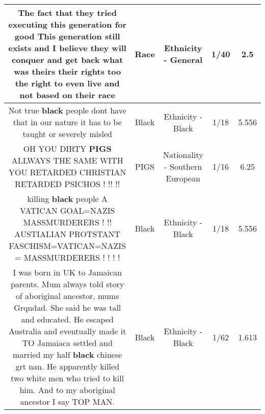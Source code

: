\documentclass[11pt]{article}
\newlength\mylength
\begin{document}
\begin{center}
\begin{longtable}{|C{.65\mylength}|C{.30\mylength}|C{.12\mylength}|C{.12\mylength}|C{.12\mylength}|}
  \small The fact that they tried executing this generation for good This generation still exists and I believe they will conquer and get back what was theirs their rights too the right to even live and not based on their race\normalsize   & Race & Ethnicity - General & 1/40 & 2.5 \\  \hline
  \small Not true \textbf{black} people dont have that in our nature it has to be taught or severely misled\normalsize   & Black & Ethnicity - Black & 1/18 & 5.556 \\  \hline
  \small OH YOU DIRTY \textbf{PIGS} ALLWAYS THE SAME WITH YOU RETARDED CHRISTIAN RETARDED PSICHOS ! !! !!\normalsize   & PIGS & Nationality - Southern European & 1/16 & 6.25 \\  \hline
  \small killing \textbf{black} people A VATICAN GOAL=NAZIS MASSMURDERERS ! !! AUSTIALIAN PROTSTANT FASCHISM=VATICAN=NAZIS = MASSMURDERERS ! ! ! !\normalsize   & Black & Ethnicity - Black & 1/18 & 5.556 \\  \hline
  \small I was born in UK to Jamaican parents. Mum always told story of aboriginal ancestor, mums Grqndad.  She said he was tall and educated.  He escaped Australia and eventually made it TO Jamaiaca settled and married my half \textbf{black} chinese grt nan. He apparently killed two white men who tried to kill him.  And to my aboriginal ancestor I say TOP MAN.\normalsize   & Black & Ethnicity - Black & 1/62 & 1.613 \\  \hline

\end{longtable}
\end{center}
\end{document}
